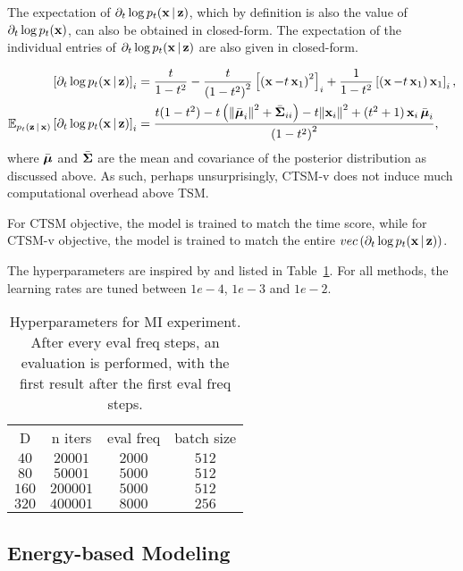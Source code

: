 The expectation of $\partial_{t}\log p_{t}(\operatorname{\mathbf{x}}|\operatorname{\mathbf{z}})$, which by definition is also the value of $\partial_{t}\log p_{t}(\operatorname{\mathbf{x}})$, can also be obtained in closed-form. The expectation of the individual entries of $\partial_{t}\log p_{t}(\operatorname{\mathbf{x}}|\operatorname{\mathbf{z}})$ are also given in closed-form.

\begin{align}
\left[\partial_{t}\log p_{t}(\operatorname{\mathbf{x}}|\operatorname{\mathbf{z}})\right]_{i} &= \frac{t}{1-t^{2}} - \frac{t}{\left(1-t^{2}\right)^{2}}\left[\left(\operatorname{\mathbf{x}}-t\operatorname{\mathbf{x}}_{1}\right)^{2}\right]_{i} + \frac{1}{1-t^{2}}\left[\left(\operatorname{\mathbf{x}}-t\operatorname{\mathbf{x}}_{1}\right)\operatorname{\mathbf{x}}_{1}\right]_{i},\\
\mathbb{E}_{p_{t}(\operatorname{\mathbf{z}}|\operatorname{\mathbf{x}})}\left[\partial_{t}\log p_{t}(\operatorname{\mathbf{x}}|\operatorname{\mathbf{z}})\right]_{i} &= \frac{t(1-t^{2}) -t\left(\norm{\bar{\operatorname{\bm{\mu}}}_{i}}^{2}+\bar{\operatorname{\mathbf{\Sigma}}}_{ii}\right) - t\norm{\operatorname{\mathbf{x}}_{i}}^{2} + (t^{2}+1)\operatorname{\mathbf{x}}_{i}\bar{\operatorname{\bm{\mu}}}_{i}}{\left(1-t^{2}\right)^{2}},
\end{align}
where $\bar{\operatorname{\bm{\mu}}}$ and $\bar{\operatorname{\mathbf{\Sigma}}}$ are the mean and covariance of the posterior distribution as discussed above. As such, perhaps unsurprisingly, CTSM-v does not induce much computational overhead above TSM.

For CTSM objective, the model is trained to match the time score, while for CTSM-v objective, the model is trained to match the entire $vec\left(\partial_{t}\log p_{t}(\operatorname{\mathbf{x}}|\operatorname{\mathbf{z}})\right)$.

The hyperparameters are inspired by \citet{choi2022densityratio} and listed in Table~\ref{tbl:mi-hyper}. For all methods, the learning rates are tuned between $1e-4$, $1e-3$ and $1e-2$.

\begin{table}[]
    \centering
    \caption{Hyperparameters for MI experiment. After every $\text{eval freq}$ steps, an evaluation is performed, with the first result after the first $\text{eval freq}$ steps.}
    \begin{tabular}{c|c|c|c}
        D & n iters & eval freq & batch size \\
        $40$ & $20001$ & $2000$ & $512$ \\
        $80$ & $50001$ & $5000$ & $512$ \\
        $160$ & $200001$ & $5000$ & $512$ \\
        $320$ & $400001$ & $8000$ & $256$
    \end{tabular}
    \label{tbl:mi-hyper}
\end{table}

\subsection{Energy-based Modeling}
\label{app:sec:ebm}

